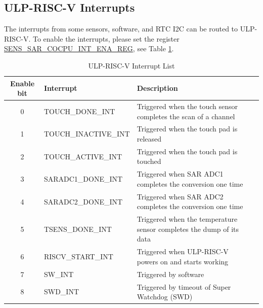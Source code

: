 \documentclass[main\_\_EN.tex]{subfiles}
\begin{document}
\subsection{ULP-RISC-V Interrupts} \label{ulp-risc-v-interrupts}

The interrupts from some sensors, software, and RTC I2C can be routed to ULP-RISC-V. To enable the interrupts, please set the register \hyperref[regdesc:SENSSARCOCPUINTENAREG]{SENS\_SAR\_COCPU\_INT\_ENA\_REG}, see Table \ref{table:PicoRV32 interrupt list}.

\begin{table}[!ht ]
    \centering
    \begin{tabular}{ c l l l }
    \textbf{Enable bit } & \textbf{Interrupt} & \textbf{Description} \\ \hline
    0 & \label{interrupt:SENSCOCPUTOUCHDONEINT}TOUCH\_DONE\_INT & Triggered when the touch sensor completes the scan of a channel \\
    1 & \label{interrupt:SENSCOCPUTOUCHINACTIVEINT}TOUCH\_INACTIVE\_INT & Triggered when the touch pad is released \\
    2 & \label{interrupt:SENSCOCPUTOUCHACTIVEINT}TOUCH\_ACTIVE\_INT & Triggered when the touch pad is touched \\
    3 & \label{interrupt:SENSCOCPUSARADC1DONEINT}SARADC1\_DONE\_INT & Triggered when SAR ADC1 completes the conversion one time \\
    4 & \label{interrupt:SENSCOCPUSARADC2DONEINT}SARADC2\_DONE\_INT & Triggered when SAR ADC2 completes the conversion one time \\
    5 & \label{interrupt:SENSCOCPUTSENSINT}TSENS\_DONE\_INT & Triggered when the temperature sensor completes the dump of its data \\
    6 & \label{interrupt:SENSCOCPUSTARTINT}RISCV\_START\_INT  & Triggered when ULP-RISC-V powers on and starts working \\
    7 & \label{interrupt:SENSCOCPUSWINT}SW\_INT  & Triggered by software \\
    8 & \label{interrupt:SENSCOCPUSWDINT}SWD\_INT & Triggered by timeout of Super Watchdog (SWD) \\
    \end{tabular}
    \caption{ULP-RISC-V Interrupt List}
    \label{table:PicoRV32 interrupt list}
\end{table}
\end{document}
